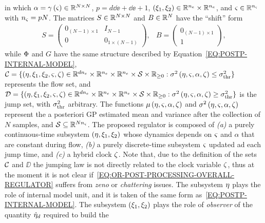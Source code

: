in which $\alpha = \gamma \left( \varsigma \right) \in \mathbb{R}^{N \times N}$, $p = d\dd{\ee} + \dd{\ee} + 1$,
$\left( \xi_1, \xi_2 \right) \in \mathbb{R}^{n_{e}} \times \mathbb{R}^{n_{e}}$, and $\varsigma \in \mathbb{R}^{n_{\varsigma}}$ with $n_{\varsigma} = pN$.
The matrices $S \in \mathbb{R}^{N \times N}$ and $B \in \mathbb{R}^{N}$ have the ``shift'' form
\begin{equation*}
   \begin{matrix}
      S = 
      \begin{pmatrix}
         0_{(N-1) \times 1} & I_{N-1} \\
         0 & 0_{1 \times (N-1)}
      \end{pmatrix}, &
      B = 
      \begin{pmatrix}
         0_{(N-1) \times 1} \\ 1
      \end{pmatrix},
   \end{matrix}
\end{equation*}
while $\Phi$ and $G$ have the same structure described by Equation~\eqref{EQ:POSTP-INTERNAL-MODEL},
$\mathcal{C} = \{ \left( \eta, \xi_1, \xi_2, \varsigma, \zeta \right) \in \mathbb{R}^{dn_{e}} \times \mathbb{R}^{n_{e}} \times \mathbb{R}^{n_{e}} \times \mathcal{S} \times \mathbb{R}_{\ge 0} : \sigma^2 \left( \eta, \varsigma, \alpha, \zeta \right) \le \sigma^2_{\text{thr}} \}$
represents the flow set, and
$\mathcal{D} = \{ \left( \eta, \xi_1, \xi_2, \varsigma, \zeta \right) \in \mathbb{R}^{dn_{e}} \times \mathbb{R}^{n_{e}} \times \mathbb{R}^{n_{e}} \times \mathcal{S} \times \mathbb{R}_{\ge 0} : \sigma^2 \left( \eta, \varsigma, \alpha, \zeta \right) \ge \sigma^2_{\text{thr}} \}$
is the jump set, with $\sigma^2_{\text{thr}}$ arbitrary. The functions $\mu \left( \eta, \varsigma, \alpha, \zeta \right)$ and $\sigma^2 \left( \eta, \varsigma, \alpha, \zeta \right)$
represent the a posteriori GP estimated mean and variance after the collection of $N$ samples, and $\mathcal{S} \subseteq \mathbb{R}^{N n_{\varsigma}}$.
The proposed regulator is composed of \textit{(a)} a purely continuous-time subsystem $\left( \eta, \xi_1, \xi_2 \right)$ whose dynamics depends
on $\varsigma$ and $\alpha$ that are constant during flow, \textit{(b)} a purely discrete-time subsystem $\varsigma$ updated ad each jump time,
and \textit{(c)} a hybrid clock $\zeta$. Note that, due to the definition of the sets $\mathcal{C}$ and $\DD$ the jumping law is not directly
related to the clock variable $\zeta$, thus at the moment it is not clear if~\eqref{EQ:OR-POST-PROCESSING-OVERALL-REGULATOR} suffers from
\textit{zeno} or \textit{chattering} issues.
The subsystem $\eta$ plays the role of internal model unit, and it is taken of the same form as~\eqref{EQ:POSTP-INTERNAL-MODEL}.
The subsystem $\left( \xi_1, \xi_2 \right)$ plays the role of \textit{observer} of the quantity $\dot{\eta}_d$ required to build the 
